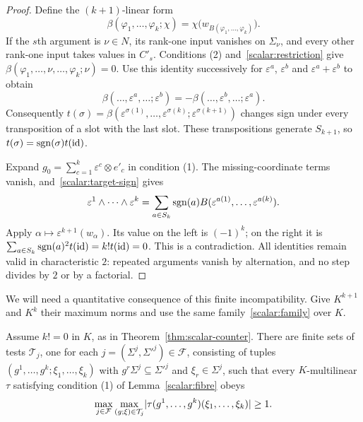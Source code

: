 \begin{proof}
Define the $(k+1)$\nobreakdash-linear form
\[
 \beta(\varphi_1,\dots,\varphi_k;\chi)
   =\chi\bigl(w_{B(\varphi_1,\dots,\varphi_k)}\bigr).
\]
If the $s$th argument is $\nu\in N$, its rank-one input vanishes on $\Sigma_\nu$, and every other
rank-one input takes values in $C'_s$. Conditions (2) and~\eqref{scalar:restriction} give
$\beta(\varphi_1,\dots,\nu,\dots,\varphi_k;\nu)=0$. Use this identity successively for
$\varepsilon^a$, $\varepsilon^b$ and $\varepsilon^a+\varepsilon^b$ to obtain
\[
 \beta(\dots,\varepsilon^a,\dots;\varepsilon^b)
 =-\beta(\dots,\varepsilon^b,\dots;\varepsilon^a).
\]
Consequently
$t(\sigma)=\beta(\varepsilon^{\sigma(1)},\dots,\varepsilon^{\sigma(k)};
\varepsilon^{\sigma(k+1)})$ changes sign under every transposition of a slot with the last slot.
These transpositions generate $S_{k+1}$, so $t(\sigma)=\operatorname{sgn}(\sigma)t(\mathrm{id})$.

Expand $g_0=\sum_{c=1}^k\varepsilon^c\otimes e'_c$ in condition (1). The missing-coordinate terms vanish,
and~\eqref{scalar:target-sign} gives
\[
 \varepsilon^1\wedge\cdots\wedge\varepsilon^k
 =\sum_{a\in S_k}\operatorname{sgn}(a)B(\varepsilon^{a(1)},\dots,\varepsilon^{a(k)}).
\]
Apply $\alpha\mapsto\varepsilon^{k+1}(w_\alpha)$. Its value on the left is $(-1)^k$; on the right it is
$\sum_{a\in S_k}\operatorname{sgn}(a)^2t(\mathrm{id})=k!t(\mathrm{id})=0$. This is a contradiction. All identities remain valid in
characteristic $2$: repeated arguments vanish by alternation, and no step divides by $2$ or by a factorial.
\end{proof}

We will need a quantitative consequence of this finite incompatibility. Give $K^{k+1}$ and $K^k$ their
maximum norms and use the same family~\eqref{scalar:family} over $K$.

\begin{lemma}\label{scalar:certificate}
Assume $k!=0$ in $K$, as in Theorem~\ref{thm:scalar-counter}. There are finite sets of tests $\mathcal T_j$, one for each $j=(\Sigma^j,\Sigma'^j)\in\mathcal F$, consisting of
tuples $(g^1,\dots,g^k;\xi_1,\dots,\xi_k)$ with $g^r\Sigma^j\subseteq\Sigma'^j$ and $\xi_r\in\Sigma^j$,
such that every $K$\nobreakdash-multilinear $\tau$ satisfying condition (1) of Lemma~\ref{scalar:fibre} obeys
\begin{equation}\label{scalar:threshold}
 \max_{j\in\mathcal F}\max_{(g;\xi)\in\mathcal T_j}
 \lvert \tau(g^1,\dots,g^k)(\xi_1,\dots,\xi_k)\rvert\ge1.
\end{equation}
\end{lemma}

